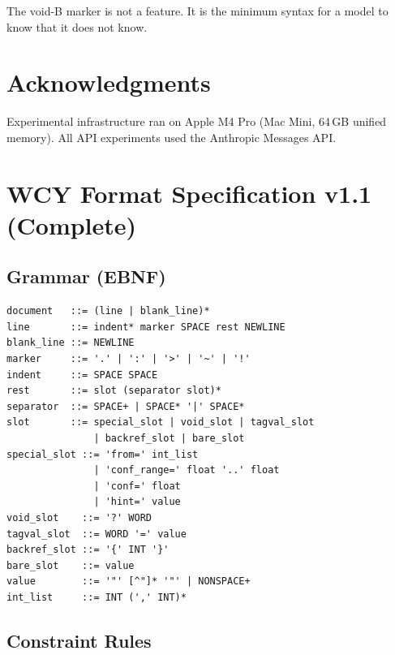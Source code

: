 \documentclass[11pt,a4paper]{article}
\begin{document}
\begin{claimbox}
The void-B marker is not a feature. It is the minimum syntax for a model to know that it does not know.
\end{claimbox}

\section*{Acknowledgments}

Experimental infrastructure ran on Apple M4 Pro (Mac Mini, 64\,GB unified memory). All API experiments used the Anthropic Messages API. 




\appendix

\section{WCY Format Specification v1.1 (Complete)}
\label{app:spec}

\subsection{Grammar (EBNF)}

\begin{lstlisting}
document   ::= (line | blank_line)*
line       ::= indent* marker SPACE rest NEWLINE
blank_line ::= NEWLINE
marker     ::= '.' | ':' | '>' | '~' | '!'
indent     ::= SPACE SPACE
rest       ::= slot (separator slot)*
separator  ::= SPACE+ | SPACE* '|' SPACE*
slot       ::= special_slot | void_slot | tagval_slot
               | backref_slot | bare_slot
special_slot ::= 'from=' int_list
               | 'conf_range=' float '..' float
               | 'conf=' float
               | 'hint=' value
void_slot    ::= '?' WORD
tagval_slot  ::= WORD '=' value
backref_slot ::= '{' INT '}'
bare_slot    ::= value
value        ::= '"' [^"]* '"' | NONSPACE+
int_list     ::= INT (',' INT)*
\end{lstlisting}

\subsection{Constraint Rules}
\end{document}
